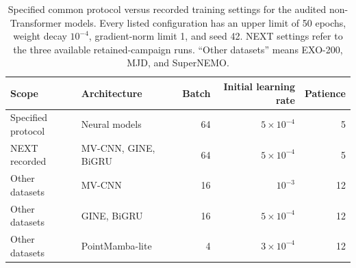 \begin{table}[t]
\centering
\small
\caption{Specified common protocol versus recorded training settings for the audited non-Transformer models. Every listed configuration has an upper limit of 50 epochs, weight decay $10^{-4}$, gradient-norm limit 1, and seed 42. NEXT settings refer to the three available retained-campaign runs. ``Other datasets'' means EXO-200, MJD, and SuperNEMO.}
\label{tab:wing-training}
\begin{tabular}{llrrr}
\toprule
Scope & Architecture & Batch & Initial learning rate & Patience \\
\midrule
Specified protocol & Neural models & 64 & $5\times10^{-4}$ & 5 \\
NEXT recorded & MV-CNN, GINE, BiGRU & 64 & $5\times10^{-4}$ & 5 \\
Other datasets & MV-CNN & 16 & $10^{-3}$ & 12 \\
Other datasets & GINE, BiGRU & 16 & $5\times10^{-4}$ & 12 \\
Other datasets & PointMamba-lite & 4 & $3\times10^{-4}$ & 12 \\
\bottomrule
\end{tabular}
\end{table}
